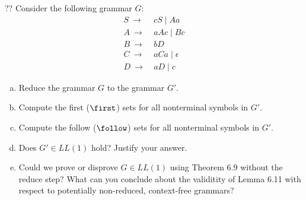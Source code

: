 \begin{exercise}{??}
Consider the following grammar $G$:
    \begin{align*}
        S ~\to~ & c S \mid A a \\
        A ~\to~ & a A c \mid B c \\
        B ~\to~ & b D \\
        C ~\to~ & a C a \mid \epsilon \\
        D ~\to~ & a D \mid c
    \end{align*}

\begin{enumerate}[(a)]
    \item Reduce the grammar $G$ to the grammar $G'$.
    \item Compute the first ($\first$) sets for all nonterminal symbols in $G'$.
    \item Compute the follow ($\follow$) sets for all nonterminal symbols in $G'$.
    \item Does $G' \in LL(1)$ hold? Justify your answer.
    \item Could we prove or disprove $G \in LL(1)$ using Theorem 6.9 without the reduce step? What can you conclude about the validitity of Lemma 6.11 with respect to potentially non-reduced, context-free grammars?
\end{enumerate}
\end{exercise}

